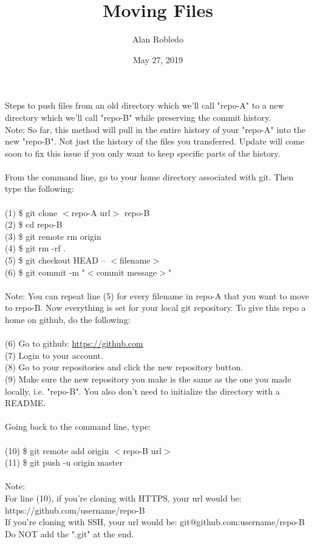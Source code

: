 \documentclass{article}
\title{Moving Files}
\author{Alan Robledo}
\date{May 27, 2019}
\begin{document}
\maketitle
\noindent 
Steps to push files from an old directory which we'll call "repo-A" to a new directory which we'll call "repo-B" while preserving the commit history.\\
Note: So far, this method will pull in the entire history of your "repo-A" into the new "repo-B". Not just the history of the files you transferred. Update will come soon to fix this issue if you only want to keep specific parts of the history. \\
\\
From the command line, go to your home directory associated with git. 
Then type the following:\\
\\
(1) \$ git clone $<$repo-A url$>$ repo-B \\
(2) \$ cd repo-B \\
(3) \$ git remote rm origin \\
(4) \$ git rm -rf . \\
(5) \$ git checkout HEAD -- $<$filename$>$ \\
(6) \$ git commit -m "$<$commit message$>$" \\
\\
Note: You can repeat line (5) for every filename in repo-A that you want to move to repo-B.
Now everything is set for your local git repository. 
To give this repo a home on github, do the following:\\
\\
(6) Go to github: \url{https://github.com} \\
(7) Login to your account. \\ 
(8) Go to your repositories and click the new repository button. \\
(9) Make sure the new repository you make is the same as the one you made locally, i.e. "repo-B". You also don't need to initialize the directory with a README. \\
\\
Going back to the command line, type: \\
\\
(10) \$ git remote add origin $<$repo-B url$>$ \\
(11) \$ git push -u origin master \\
\\
Note: \\
For line (10), if you're cloning with HTTPS, your url would be: https://github.com/username/repo-B \\
If you're cloning with SSH, your url would be: git@github.com:username/repo-B \\
Do NOT add the ".git" at the end.
\end{document}
